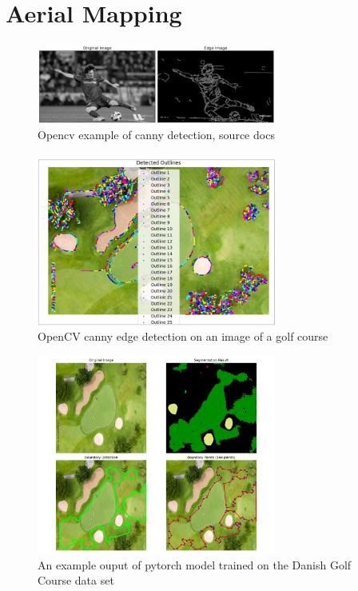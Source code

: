 \documentclass[final]{cmpreport_02}
\begin{document}
\clearpage
\section{Aerial Mapping}

\begin{figure}[h!]
	\centering
	\includegraphics[width=0.7\textwidth]{./images/openCvCannyExample.jpg}
	\caption{Opencv example of canny detection, source \citep{opencv_library} docs}
	\label{am:cannyexample}
\end{figure}


\begin{figure}[h!]
	\centering
	\includegraphics[width=0.7\textwidth]{./images/openCvCannyGolfCourse.png}
	\caption{OpenCV canny edge detection on an image of a golf course}
	\label{am:CannyGolfCourse}
\end{figure}

\begin{figure}[h!]
	\centering
	\includegraphics[width=0.7\textwidth]{./images/AdobeGolf_visualisation.png}
	\caption{An example ouput of pytorch model trained on the Danish Golf Course data set}
	\label{am:AGDanish}
\end{figure}
\end{document}
